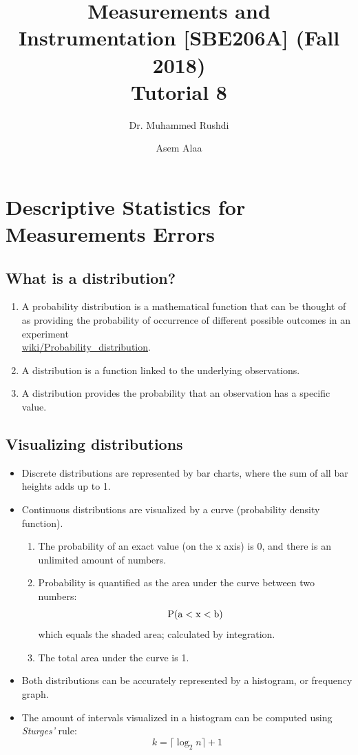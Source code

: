 \documentclass[a4paper,11pt]{book}
\begin{document}
\author{Dr. Muhammed Rushdi \and Asem Alaa}

\title{Measurements and Instrumentation [SBE206A] (Fall 2018)\\ Tutorial 8}

\maketitle


\chapter*{Descriptive Statistics for Measurements Errors}

\twocolumn

\section*{What is a distribution?}
\begin{enumerate}
\item A probability distribution is a mathematical function that can be thought of as providing the probability of occurrence of different possible outcomes in an experiment\\ \href{https://en.wikipedia.org/wiki/Probability_distribution}{wiki/Probability\_distribution}.
\item A distribution is a function linked to the underlying observations.
\item A distribution provides the probability that an observation has a specific value.
\end{enumerate}

\section*{Visualizing distributions}

\begin{itemize}
\item Discrete distributions are represented by bar charts, where the sum of all bar heights adds up to 1.
\item Continuous distributions are visualized by a curve (probability density function). 
\begin{enumerate}
\item The probability of an exact value (on the x axis) is 0, and there is an unlimited amount of numbers. 
\item Probability is quantified as the area under the curve between two numbers: $$\rm P(a < x < b) $$
which equals the shaded area; calculated by integration.
\item The total area under the curve is 1.
\end{enumerate}
\item Both distributions can be accurately represented by a histogram, or frequency graph.
\item The amount of intervals visualized in a histogram can be computed using \emph{Sturges'} rule:
\begin{equation}
k = \lceil \log_2 n \rceil+ 1
\end{equation}
\end{itemize}
\end{document}
